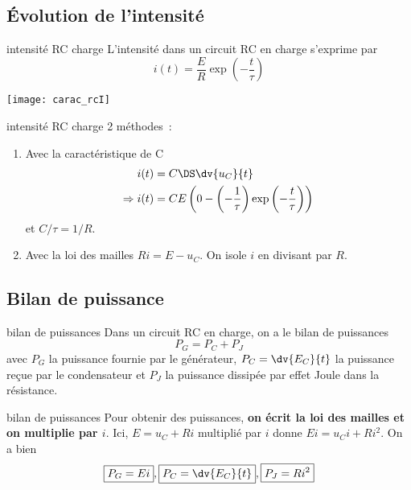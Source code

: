 \documentclass[../main/main.tex]{subfiles}
\begin{document}
\subsection{Évolution de l'intensité}
\begin{tcbraster}[raster columns=2, raster equal height=rows]
    \begin{prop}[label=prop:irc-charge, sidebyside]{intensité RC charge}
        L'intensité dans un circuit RC en charge s'exprime par
        \[\boxed{i(t) = \frac{E}{R}\exp \left(-\frac{t}{\tau} \right)}\]
        \tcblower
        \begin{center}
            \texttt{[image: carac\_rcI]}
        \end{center}
    \end{prop}
    \begin{demo}[label=demo:irc-charge]{intensité RC charge}
        2 méthodes~:
        \begin{enumerate}
            \item Avec la caractéristique de C
                \begin{align*}
                                i(t) &= C\DS \dv{u_C}{t}\\
                    \Rightarrow i(t) &= CE \left(0 -
                        \left(-\frac{1}{\tau} \right)
                        \exp \left(- \frac{t}{\tau} \right) \right)
                \end{align*}
                et $C/\tau = 1/R$.
            \item Avec la loi des mailles $Ri = E - u_C$. On isole $i$ en
                divisant par $R$.
        \end{enumerate}
    \end{demo}
\end{tcbraster}

\subsection{Bilan de puissance}

\begin{tcbraster}[raster columns=2, raster equal height=rows]
    \begin{prop}[label=prop:rcpuiss-charge]{bilan de puissances}
        Dans un circuit RC en charge, on a le bilan de puissances
        \[ \boxed{P_G = P_C + P_J}\]
        avec $P_G$ la puissance fournie par le générateur, $P_C = \dv{E_C}{t}$
        la puissance reçue par le condensateur et $P_J$ la puissance dissipée
        par effet Joule dans la résistance.
    \end{prop}
    \begin{demo}[label=demo:rcpuiss-charge]{bilan de puissances}
        Pour obtenir des puissances, \textbf{on écrit la loi des mailles et on
        multiplie par $i$}. Ici, $E = u_C + Ri$ multiplié par $i$ donne $Ei =
        u_Ci + Ri^2$. On a bien
        \[\boxed{P_G = Ei}, \boxed{P_C = \dv{E_C}{t}}, \boxed{P_J=Ri^2}\]
    \end{demo}
\end{tcbraster}
\end{document}
